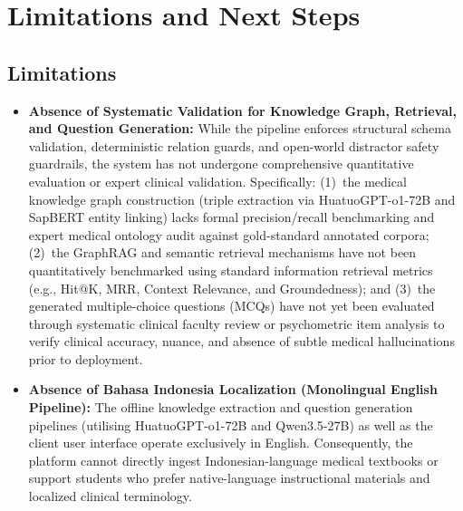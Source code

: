 
\section*{Limitations and Next Steps}

\subsection*{Limitations}

\begin{itemize}
    \item \textbf{Absence of Systematic Validation for Knowledge Graph, Retrieval, and Question Generation:}
          While the pipeline enforces structural schema validation, deterministic relation guards, and open-world distractor safety guardrails, the system has not undergone comprehensive quantitative evaluation or expert clinical validation. Specifically:
          (1)~the medical knowledge graph construction (triple extraction via HuatuoGPT-o1-72B and SapBERT entity linking) lacks formal precision/recall benchmarking and expert medical ontology audit against gold-standard annotated corpora;
          (2)~the GraphRAG and semantic retrieval mechanisms have not been quantitatively benchmarked using standard information retrieval metrics (e.g., Hit@K, MRR, Context Relevance, and Groundedness); and
          (3)~the generated multiple-choice questions (MCQs) have not yet been evaluated through systematic clinical faculty review or psychometric item analysis to verify clinical accuracy, nuance, and absence of subtle medical hallucinations prior to deployment.

    \item \textbf{Absence of Bahasa Indonesia Localization (Monolingual English Pipeline):}
          The offline knowledge extraction and question generation pipelines (utilising HuatuoGPT-o1-72B and Qwen3.5-27B) as well as the client user interface operate exclusively in English. Consequently, the platform cannot directly ingest Indonesian-language medical textbooks or support students who prefer native-language instructional materials and localized clinical terminology.


\end{itemize}
